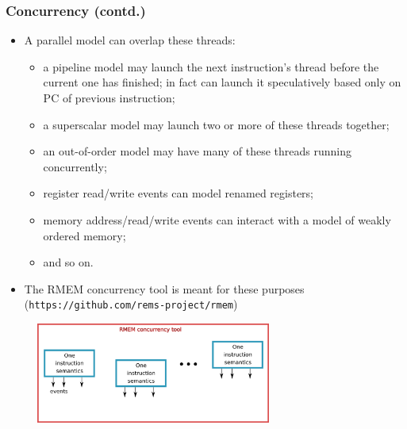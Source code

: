 \documentclass[aspectratio=169]{beamer}
\newcommand{\slidefont}{\scriptsize}
\begin{document}

\begin{frame}[fragile]
  \frametitle{Concurrency (contd.)}

  \slidefont

  \begin{itemize}

  \item
    A parallel model can overlap these threads:
    \begin{itemize}\slidefont
    \item a pipeline model may launch the next instruction's thread before the current one has
      finished; in fact can launch it speculatively based only on PC of previous instruction;
    \item a superscalar model may launch two or more of these threads together;
    \item an out-of-order model may have many of these threads running concurrently;
    \item register read/write events can model renamed registers;
    \item memory address/read/write events can interact with a model of weakly ordered memory;
    \item and so on.
    \end{itemize}

  \item The RMEM concurrency tool is meant for these purposes ({\tt https://github.com/rems-project/rmem})
  \end{itemize}

  \vfill

  \begin{figure}[htbp]
    \centerline{\includegraphics[height=1.3in]{Figures/Fig_concurrency.png}}
  \end{figure}

\end{frame}

\end{document}
